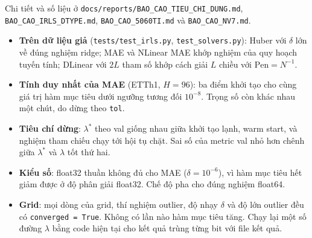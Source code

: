Chi tiết và số liệu ở \texttt{docs/reports/BAO\_CAO\_TIEU\_CHI\_DUNG.md}, \texttt{BAO\_CAO\_IRLS\_DTYPE.md}, \texttt{BAO\_CAO\_5060TI.md} và \texttt{BAO\_CAO\_NV7.md}.
\begin{itemize}
    \item \textbf{Trên dữ liệu giả} (\texttt{tests/test\_irls.py}, \texttt{test\_solvers.py}): Huber với $\delta$ lớn về đúng nghiệm ridge; MAE và NLinear MAE khớp nghiệm của quy hoạch tuyến tính; DLinear với $2L$ tham số khớp cách giải $L$ chiều với $\mathrm{Pen} = N^{-1}$.
    \item \textbf{Tính duy nhất của MAE} (ETTh1, $H = 96$): ba điểm khởi tạo cho cùng giá trị hàm mục tiêu dưới ngưỡng tương đối $10^{-8}$. Trọng số còn khác nhau một chút, do dừng theo \texttt{tol}.
    \item \textbf{Tiêu chí dừng}: $\lambda^*$ theo val giống nhau giữa khởi tạo lạnh, warm start, và nghiệm tham chiếu chạy tới hội tụ chặt. Sai số của metric val nhỏ hơn chênh giữa $\lambda^*$ và $\lambda$ tốt thứ hai.
    \item \textbf{Kiểu số}: float32 thuần không đủ cho MAE ($\delta = 10^{-6}$), vì hàm mục tiêu hết giảm được ở độ phân giải float32. Chế độ pha cho đúng nghiệm float64.
    \item \textbf{Grid}: mọi dòng của grid, thí nghiệm outlier, độ nhạy $\delta$ và độ lớn outlier đều có \texttt{converged = True}. Không có lần nào hàm mục tiêu tăng. Chạy lại một số đường $\lambda$ bằng code hiện tại cho kết quả trùng từng bit với file kết quả.
\end{itemize}
